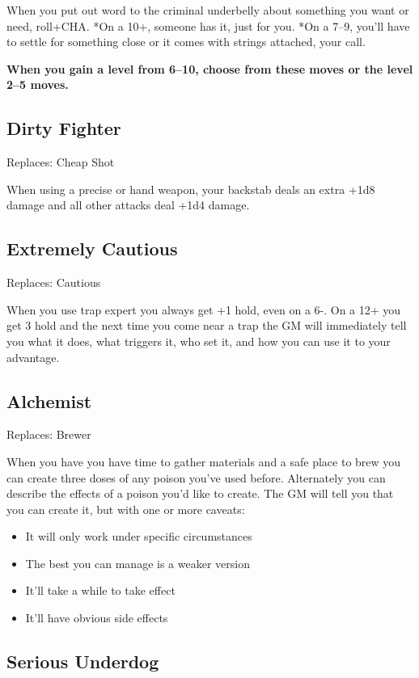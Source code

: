  When you put out word to the criminal underbelly about something you want or need, roll+CHA. *On a 10+, someone has it, just for you. *On a 7--9, you'll have to settle for something close or it comes with strings attached, your call.


\vspace{\baselineskip}
 {\bfseries When you gain a level from 6--10, choose from these moves or the level 2--5 moves.}
\subsection{Dirty Fighter}


 Replaces: Cheap Shot


 When using a precise or hand weapon, your backstab deals an extra +1d8 damage and all other attacks deal +1d4 damage.
\subsection{Extremely Cautious}


 Replaces: Cautious


 When you use trap expert you always get +1 hold, even on a 6-. On a 12+ you get 3 hold and the next time you come near a trap the GM will immediately tell you what it does, what triggers it, who set it, and how you can use it to your advantage.
\subsection{Alchemist}


 Replaces: Brewer


 When you have you have time to gather materials and a safe place to brew you can create three doses of any poison you've used before. Alternately you can describe the effects of a poison you'd like to create. The GM will tell you that you can create it, but with one or more caveats:
\begin{itemize}
\item It will only work under specific circumstances
\item The best you can manage is a weaker version
\item It'll take a while to take effect
\item It'll have obvious side effects

\end{itemize}
\subsection{Serious Underdog}


